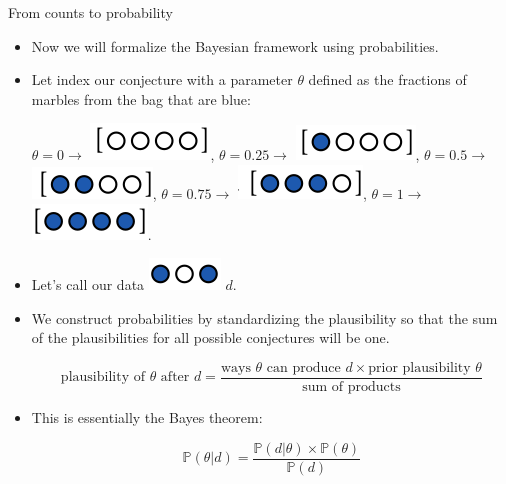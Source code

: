 \documentclass[handout]{beamer}
\begin{document}
\begin{frame}{From counts to probability}
\scriptsize{
\begin{itemize}
 \item Now  we will formalize the Bayesian framework using probabilities.
\item Let index our conjecture with a parameter $\theta$ defined as the fractions of marbles from the bag that are blue:

$\theta=0 \rightarrow$ \includegraphics[scale=0.3]{pics/marbles10.png}, $\theta=0.25 \rightarrow$ \includegraphics[scale=0.3]{pics/marbles17.png}, $\theta=0.5 \rightarrow$ \includegraphics[scale=0.3]{pics/marbles13.png},  $\theta=0.75 \rightarrow$ \includegraphics[scale=0.3]{pics/marbles14.png}, $\theta=1 \rightarrow$ \includegraphics[scale=0.3]{pics/marbles11.png}.

\item Let's call our data \includegraphics[scale=0.3]{pics/marbles2.png} $d$. 

\item We construct probabilities by standardizing the plausibility so that the sum of the plausibilities for all possible conjectures will be one.

\begin{equation}
 \text{plausibility of $\theta$ after $d$} = \frac{\text{ways $\theta$ can produce $d$} \times \text{prior plausibility $\theta$}}{\text{sum of products}}
\end{equation}

\item This is essentially the Bayes theorem:

\begin{equation}
 \mathbb{P}(\theta|d) = \frac{\mathbb{P}(d|\theta) \times \mathbb{P}(\theta)}{\mathbb{P}(d)}
\end{equation}


\end{itemize}
 } 
 
 \end{frame}
\end{document}
